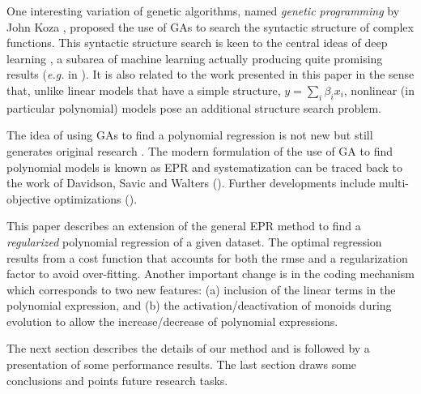 \documentclass[preprint,authoryear,12pt]{elsarticle}
\begin{document}
One interesting variation of genetic algorithms, named \emph{genetic programming} by John Koza \citep{Koza:1992aa}, proposed the use of \acp{GA} to search the syntactic structure of complex functions. This syntactic structure search is keen to the central ideas of deep learning \citep{Bengio:2009aa,Bengio:2013aa}, a subarea of machine learning actually producing quite promising results (\emph{e.g.} in \cite{Tarlow:2013fk}). It is also related to the work presented in this paper in the sense that, unlike linear models that have a simple structure, $y=\sum_i \beta_i x_i$, nonlinear (in particular polynomial) models pose an additional structure search problem.

The idea of using \acp{GA} to find a polynomial regression is not new \citep{Maertens:2006aa, Yu:2008aa, Wu:2009aa} but still generates original research \citep{Hofwing:2011aa,Cetisli:2011aa}. The modern formulation of the use of \ac{GA} to find polynomial models is known as \acf{EPR} and systematization can be traced back to the work of Davidson, Savic and Walters (\cite{Davidson:2003aa}). Further developments include multi-objective optimizations (\cite{Giustolisi:2009aa}). 

This paper describes an extension of the general \ac{EPR} method to find a \emph{regularized} polynomial regression of a given dataset. The optimal regression results from a cost function that accounts for both the \ac{rmse} and a regularization factor to avoid over-fitting. Another important change is in the coding mechanism which corresponds to two new features: (a) inclusion of the linear terms in the polynomial expression, and (b) the activation/deactivation of monoids during evolution to allow the increase/decrease of polynomial expressions.



The next section describes the details of our method and is followed by a presentation of some performance results. The last section draws some conclusions and points future research tasks.
\end{document}
